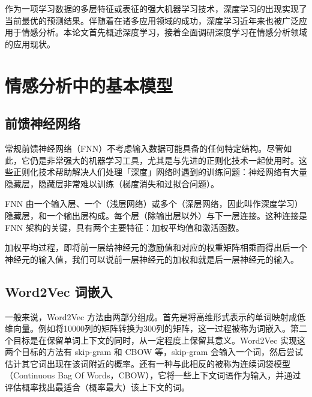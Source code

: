 \documentclass[lang=cn,11pt,a4paper]{elegantpaper}
\begin{document}
作为一项学习数据的多层特征或表征的强大机器学习技术\cite{4}，深度学习的出现实现了当前最优的预测结果。伴随着在诸多应用领域的成功，深度学习近年来也被广泛应用于情感分析。本论文首先概述深度学习，接着全面调研深度学习在情感分析领域的应用现状。

\section{情感分析中的基本模型}
\subsection{前馈神经网络}
常规前馈神经网络（FNN）不考虑输入数据可能具备的任何特定结构。尽管如此，它仍是非常强大的机器学习工具，尤其是与先进的正则化技术一起使用时。这些正则化技术帮助解决人们处理「深度」网络时遇到的训练问题：神经网络有大量隐藏层，隐藏层非常难以训练（梯度消失和过拟合问题）\cite{5}。

FNN 由一个输入层、一个（浅层网络）或多个（深层网络，因此叫作深度学习）隐藏层，和一个输出层构成。每个层（除输出层以外）与下一层连接。这种连接是 FNN 架构的关键，具有两个主要特征：加权平均值和激活函数。

加权平均过程，即将前一层给神经元的激励值和对应的权重矩阵相乘而得出后一个神经元的输入值，我们可以说前一层神经元的加权和就是后一层神经元的输入。

\subsection{Word2Vec 词嵌入}
一般来说，Word2Vec 方法由两部分组成。首先是将高维形式表示的单词映射成低维向量。例如将10000列的矩阵转换为300列的矩阵，这一过程被称为词嵌入。第二个目标是在保留单词上下文的同时，从一定程度上保留其意义\cite{6,7}。Word2Vec 实现这两个目标的方法有 skip-gram 和 CBOW 等，skip-gram 会输入一个词，然后尝试估计其它词出现在该词附近的概率。还有一种与此相反的被称为连续词袋模型（Continuous Bag Of Words，CBOW），它将一些上下文词语作为输入，并通过评估概率找出最适合（概率最大）该上下文的词。



\end{document}
